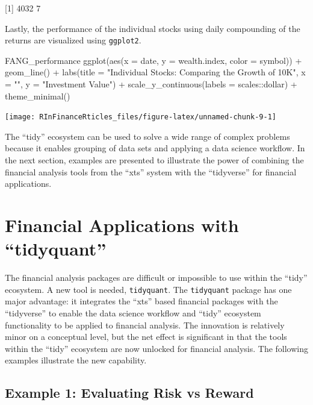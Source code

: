 {[}1{]} 4032 7

\hspace{20 mm}

Lastly, the performance of the individual stocks using daily compounding
of the returns are visualized using \texttt{ggplot2}.

\begin{Schunk}
\begin{Sinput}
FANG_performance %
    ggplot(aes(x = date, y = wealth.index, color = symbol)) +
    geom_line() +
    labs(title = "Individual Stocks: Comparing the Growth of 10K",
         x = "", y = "Investment Value") +
    scale_y_continuous(labels = scales::dollar) + 
    theme_minimal()
\end{Sinput}


\begin{center}\texttt{[image: RInFinanceRticles\_files/figure-latex/unnamed-chunk-9-1]} \end{center}

\end{Schunk}

The ``tidy'' ecosystem can be used to solve a wide range of complex
problems because it enables grouping of data sets and applying a data
science workflow. In the next section, examples are presented to
illustrate the power of combining the financial analysis tools from the
``xts'' system with the ``tidyverse'' for financial applications.

\section{\texorpdfstring{Financial Applications with
``tidyquant''}{Financial Applications with tidyquant}}\label{financial-applications-with-tidyquant}

The financial analysis packages are difficult or impossible to use
within the ``tidy'' ecosystem. A new tool is needed, \texttt{tidyquant}.
The \texttt{tidyquant} package has one major advantage: it integrates
the ``xts'' based financial packages with the ``tidyverse'' to enable
the data science workflow and ``tidy'' ecosystem functionality to be
applied to financial analysis. The innovation is relatively minor on a
conceptual level, but the net effect is significant in that the tools
within the ``tidy'' ecosystem are now unlocked for financial analysis.
The following examples illustrate the new capability.

\subsection{Example 1: Evaluating Risk vs
Reward}\label{example-1-evaluating-risk-vs-reward}

